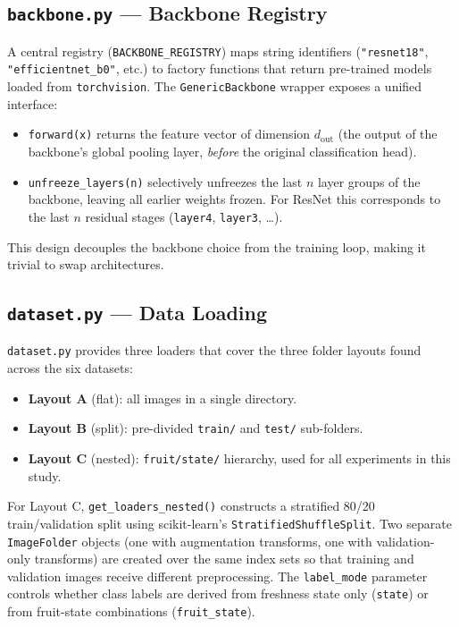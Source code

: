 \documentclass[12pt, a4paper]{article}
\begin{document}
\subsection{\texttt{backbone.py} --- Backbone Registry}

A central registry (\texttt{BACKBONE\_REGISTRY}) maps string identifiers
(\texttt{"resnet18"}, \texttt{"efficientnet\_b0"}, etc.) to factory functions
that return pre-trained models loaded from \texttt{torchvision}.
The \texttt{GenericBackbone} wrapper exposes a unified interface:
\begin{itemize}
    \item \texttt{forward(x)} returns the feature vector of dimension
    $d_\text{out}$ (the output of the backbone's global pooling layer,
    \emph{before} the original classification head).
    \item \texttt{unfreeze\_layers(n)} selectively unfreezes the last $n$
    layer groups of the backbone, leaving all earlier weights frozen.
    For ResNet this corresponds to the last $n$ residual stages
    (\texttt{layer4}, \texttt{layer3}, \ldots).
\end{itemize}
This design decouples the backbone choice from the training loop, making it
trivial to swap architectures.

\subsection{\texttt{dataset.py} --- Data Loading}

\texttt{dataset.py} provides three loaders that cover the three folder layouts
found across the six datasets:
\begin{itemize}
    \item \textbf{Layout A} (flat): all images in a single directory.
    \item \textbf{Layout B} (split): pre-divided \texttt{train/} and
    \texttt{test/} sub-folders.
    \item \textbf{Layout C} (nested): \texttt{fruit/state/} hierarchy,
    used for all experiments in this study.
\end{itemize}
For Layout C, \texttt{get\_loaders\_nested()} constructs a stratified 80/20
train/validation split using scikit-learn's \texttt{StratifiedShuffleSplit}.
Two separate \texttt{ImageFolder} objects (one with augmentation transforms,
one with validation-only transforms) are created over the same index sets so
that training and validation images receive different preprocessing.
The \texttt{label\_mode} parameter controls whether class labels are derived
from freshness state only (\texttt{state}) or from fruit-state combinations
(\texttt{fruit\_state}).
\end{document}
